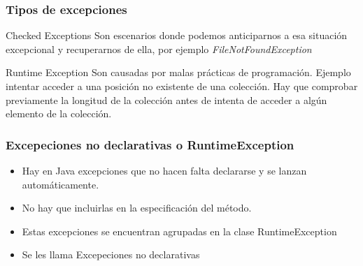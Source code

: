 \documentclass{beamer}
\begin{document}

\begin{frame}[fragile]
\frametitle{Tipos de excepciones}
\begin{block}{Checked Exceptions}
Son escenarios donde podemos anticiparnos a esa situación excepcional y recuperarnos de ella, por ejemplo \emph{FileNotFoundException}
\end{block}
\pause
\begin{block}{Runtime Exception} 
Son causadas por malas prácticas de programación. Ejemplo intentar acceder a una posición no existente de una colección. Hay que comprobar previamente la longitud de la colección antes de intenta de acceder a algún elemento de la colección.
\end{block}
\end{frame}

\begin{frame}
\frametitle{Excepeciones no declarativas o RuntimeException}
\begin{itemize}[<+->]
\item Hay en Java excepciones que no hacen falta declararse y se lanzan automáticamente.
\item No hay que incluirlas en la especificación del método.
\item Estas excepciones se encuentran agrupadas en la clase \alert{RuntimeException}
\item Se les llama \alert{Excepeciones no declarativas}
\end{itemize}
\end{frame}
\end{document}
